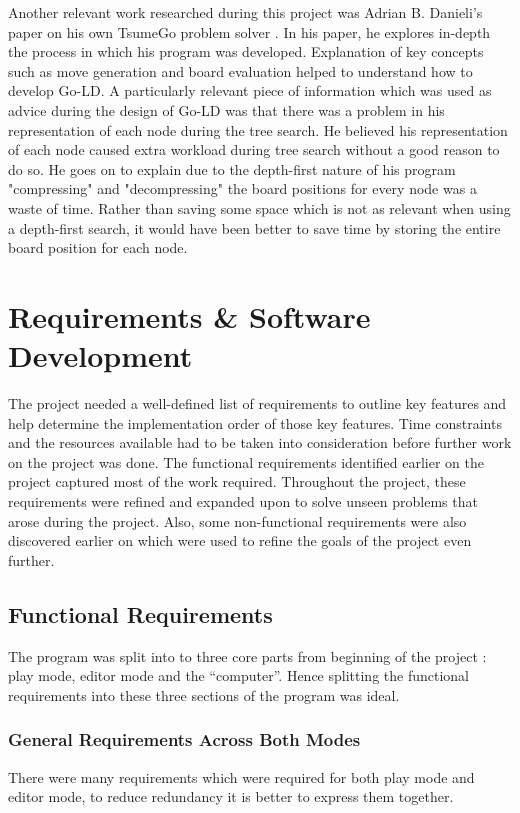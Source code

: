 \documentclass{l4proj}
\begin{document}
Another relevant work researched during this project was Adrian B. Danieli's paper on his own TsumeGo problem solver \citep{Adrian2010}. In his paper, he explores in-depth the process in which his program was developed. Explanation of key concepts such as move generation and board evaluation helped to understand how to develop Go-LD. A particularly relevant piece of information which was used as advice during the design of Go-LD was that there was a problem in his representation of each node during the tree search. He believed his representation of each node caused extra workload during tree search without a good reason to do so. He goes on to explain due to the depth-first nature of his program "compressing" and "decompressing" the board positions for every node was a waste of time. Rather than saving some space which is not as relevant when using a depth-first search, it would have been better to save time by storing the entire board position for each node.








\chapter{Requirements \& Software Development}

The project needed a well-defined list of requirements to outline key features and help determine the implementation order of those key features. Time constraints and the resources available had to be taken into consideration before further work on the project was done. The functional requirements identified earlier on the project captured most of the work required. Throughout the project, these requirements were refined and expanded upon to solve unseen problems that arose during the project. Also, some non-functional requirements were also discovered earlier on which were used to refine the goals of the project even further.

\section{Functional Requirements}

The program was split into to three core parts from beginning of the project : play mode, editor mode and the “computer”. Hence splitting the functional requirements into these three sections of the program was ideal.

\subsection{General Requirements Across Both Modes}
There were many requirements which were required for both play mode and editor mode, to reduce redundancy it is better to express them together.
\end{document}
